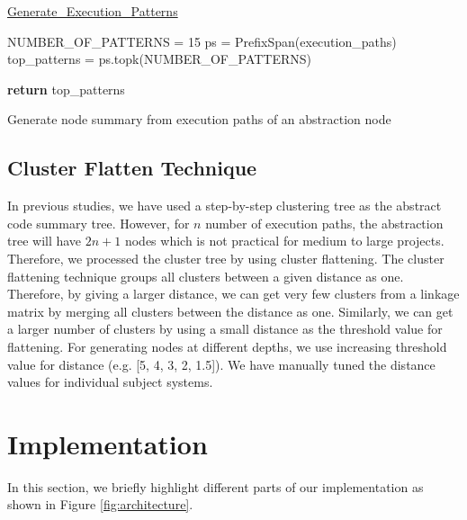 \begin{algorithm}
    
    \underline{Generate\_Execution\_Patterns} 
    
    NUMBER\_OF\_PATTERNS = 15\;
    ps = PrefixSpan(execution\_paths)\;
    top\_patterns = ps.topk(NUMBER\_OF\_PATTERNS)\; 
    
    \textbf{return} top\_patterns\;
    \caption{Generate node summary from execution paths of an abstraction node}
    \label{alg:execution_patterns}
\end{algorithm}


\subsection{Cluster Flatten Technique}

In previous studies, we have used a step-by-step clustering tree as the abstract code summary tree. However, for $n$ number of execution paths, the abstraction tree will have $2n + 1$ nodes which is not practical for medium to large projects. Therefore, we processed the cluster tree by using cluster flattening. The cluster flattening technique groups all clusters between a given distance as one. Therefore, by giving a larger distance, we can get very few clusters from a linkage matrix by merging all clusters between the distance as one. Similarly, we can get a larger number of clusters by using a small distance as the threshold value for flattening. For generating nodes at different depths, we use increasing threshold value for distance (e.g. [5, 4, 3, 2, 1.5]). We have manually tuned the distance values for individual subject systems.



\section{Implementation }
\label{hla3:implementation}
In this section, we briefly highlight different parts of our implementation as shown in Figure \ref{fig:architecture}.

